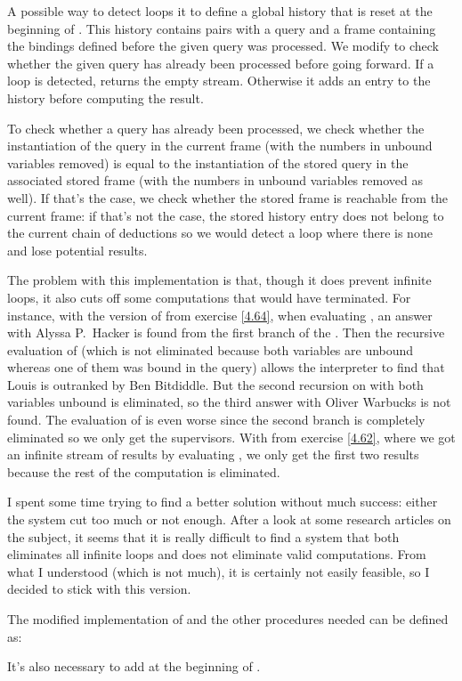 \begin{exe}[4.67]
    A possible way to detect loops it to define a global history that is reset 
    at the beginning of . This history contains pairs 
    with a query and a frame containing the bindings defined before the given 
    query was processed. We modify  to check whether the 
    given query has already been processed before going forward. If a loop is 
    detected,  returns the empty stream. Otherwise it adds an 
    entry to the history before computing the result.

    To check whether a query has already been processed, we check whether the 
    instantiation of the query in the current frame (with the numbers in unbound 
    variables removed) is equal to the instantiation of the stored query in the 
    associated stored frame (with the numbers in unbound variables removed as 
    well). If that’s the case, we check whether the stored frame is reachable 
    from the current frame: if that’s not the case, the stored history entry 
    does not belong to the current chain of deductions so we would detect a loop 
    where there is none and lose potential results.

    The problem with this implementation is that, though it does prevent 
    infinite loops, it also cuts off some computations that would have 
    terminated. For instance, with the version of  from 
    exercise \ref{4.64}, when evaluating
    , an answer with Alyssa P.~Hacker 
    is found from the first branch of the . Then the recursive 
    evaluation of  (which is not eliminated because both 
    variables are unbound whereas one of them was bound in the query) allows the 
    interpreter to find that Louis is outranked by Ben Bitdiddle. But the second 
    recursion on  with both variables unbound is eliminated, 
    so the third answer with Oliver Warbucks is not found. The evaluation of 
     is even worse since the second branch is 
    completely eliminated so we only get the supervisors. With  
    from exercise \ref{4.62}, where we got an infinite stream of results by 
    evaluating , we only get the first two results 
    because the rest of the computation is eliminated.

    I spent some time trying to find a better solution without much success: 
    either the system cut too much or not enough. After a look at some research 
    articles on the subject, it seems that it is really difficult to find 
    a system that both eliminates all infinite loops and does not eliminate 
    valid computations. From what I understood (which is not much), it is 
    certainly not easily feasible, so I decided to stick with this version.

    The modified implementation of  and the other procedures 
    needed can be defined as:

    It’s also necessary to add  at the beginning of 
    .
\end{exe}

